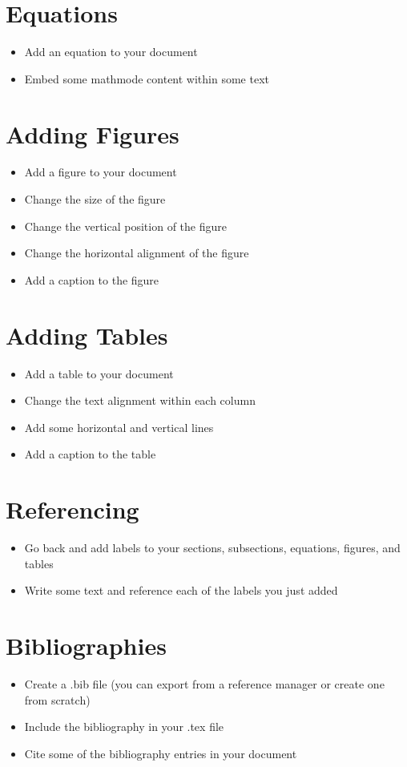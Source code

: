 \documentclass[11pt,a4paper]{article}
\begin{document}
\section{Equations}
\begin{itemize}
\item Add an equation to your document
\item Embed some mathmode content within some text
\end{itemize}

\section{Adding Figures}
\begin{itemize}
\item Add a figure to your document
\item Change the size of the figure
\item Change the vertical position of the figure
\item Change the horizontal alignment of the figure
\item Add a caption to the figure
\end{itemize}

\section{Adding Tables}
\begin{itemize}
\item Add a table to your document
\item Change the text alignment within each column
\item Add some horizontal and vertical lines
\item Add a caption to the table
\end{itemize}

\section{Referencing}
\begin{itemize}
\item Go back and add labels to your sections, subsections, equations, figures, and tables
\item Write some text and reference each of the labels you just added
\end{itemize}

\section{Bibliographies}
\begin{itemize}
\item Create a .bib file (you can export from a reference manager or create one from scratch)
\item Include the bibliography in your .tex file
\item Cite some of the bibliography entries in your document
\end{itemize}
\end{document}
